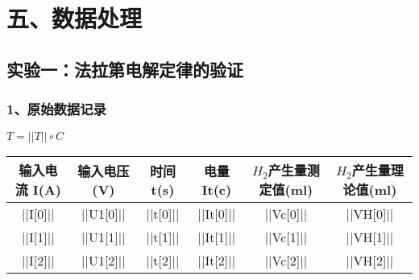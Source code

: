 \section*{五、数据处理}
        \subsection*{实验一：法拉第电解定律的验证}
    \subsubsection*{1、原始数据记录}
    \indent $T=||T||\circ C$\\
    \begin{tabular}{|c|c|c|c|c|c|}
        \hline
        输入电流 I(A) & 输入电压(V) & 时间t(s) & 电量It(c) & ${H}_{2}$产生量测定值(ml) & ${H}_{2}$产生量理论值(ml)\\
        \hline
        ||I[0]|| & ||U1[0]|| & ||t[0]|| & ||It[0]|| & ||Vc[0]|| & ||VH[0]||\\
        \hline
        ||I[1]|| & ||U1[1]|| & ||t[1]|| & ||It[1]|| & ||Vc[1]|| & ||VH[1]||\\
        \hline
        ||I[2]|| & ||U1[2]|| & ||t[2]|| & ||It[2]|| & ||Vc[2]|| & ||VH[2]||\\
        \hline
    \end{tabular}

